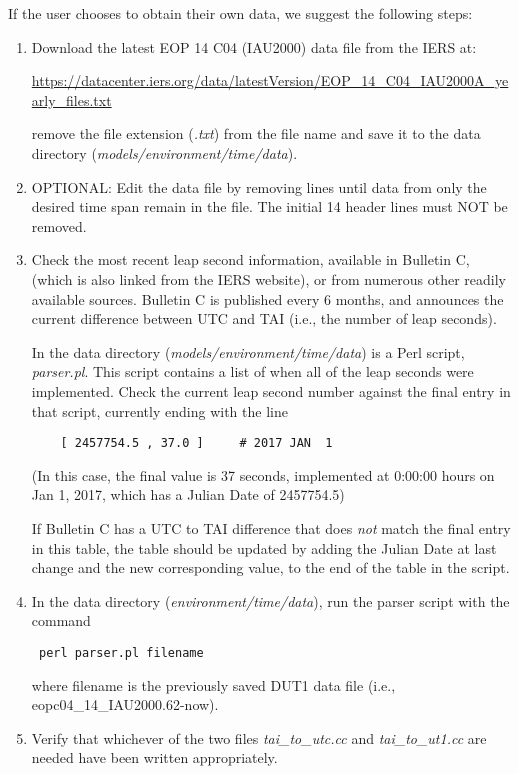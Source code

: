  If the user chooses to obtain their own data, we suggest the following steps:
 \begin{enumerate}

 \item Download the latest EOP 14 C04 (IAU2000) data file from the IERS at:

 \href{https://datacenter.iers.org/data/latestVersion/EOP_14_C04_IAU2000A_yearly_files.txt}
 {https://datacenter.iers.org/data/latestVersion/EOP\_14\_C04\_IAU2000A\_yearly\_files.txt}

 remove the file extension (\textit{.txt}) from the file name and save it to the data
 directory (\textit{models/environment/time/data}).

 \item OPTIONAL: Edit the data file by removing lines until data from only the desired
 time span remain in the file.  The initial 14 header lines must NOT be removed.

 \item Check the most recent leap second information, available in Bulletin C,
 (which is also linked from the IERS website), or from numerous other readily
 available sources.  Bulletin C is published every 6 months, and announces the
 current difference between UTC and TAI (i.e., the number of leap seconds).

 In the data directory (\textit{models/environment/time/data}) is a Perl script,
 \textit{parser.pl}.  This script contains a list of when all of the leap seconds
 were implemented.  Check the current leap second number against the final entry
 in that script, currently ending with the line
 \begin{verbatim}
    [ 2457754.5 , 37.0 ]  	 # 2017 JAN  1
 \end{verbatim}
 (In this case, the final value is 37 seconds, implemented at 0:00:00 hours on
 Jan 1, 2017, which has a Julian Date of 2457754.5)

 If Bulletin C has a UTC to TAI difference that does \textit{not} match the final entry
 in this table, the table should be updated by adding the Julian Date at last
 change and the new corresponding value, to the end of the table in the script.
 \item In the data directory (\textit{environment/time/data}), run the parser
 script with the command

 \begin {verbatim}
 perl parser.pl filename
 \end{verbatim}

 where filename is the previously saved DUT1 data file (i.e., eopc04\_14\_IAU2000.62-now).
 \item Verify that whichever of the two files \textit{tai\_to\_utc.cc}
 and \textit{tai\_to\_ut1.cc} are needed have been written appropriately.
 \end{enumerate}

